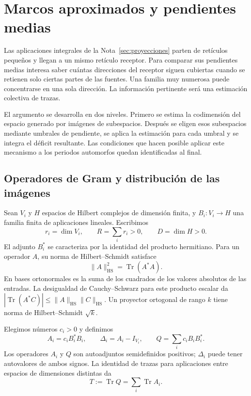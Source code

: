 \section{Marcos aproximados y pendientes medias}
\label{sec:marcos}


Las aplicaciones integrales de la Nota~\ref{sec:proyecciones} parten de
retículos pequeños y llegan a un mismo retículo receptor. Para comparar
sus pendientes medias interesa saber cuántas direcciones del receptor
siguen cubiertas cuando se retienen solo ciertas partes de las fuentes.
Una familia muy numerosa puede concentrarse en una sola dirección.
La información pertinente será una estimación colectiva de trazas.

El argumento se desarrolla en dos niveles. Primero se estima la
codimensión del espacio generado por imágenes de subespacios. Después
se eligen esos subespacios mediante umbrales de pendiente, se aplica la
estimación para cada umbral y se integra el déficit resultante. Las
condiciones que hacen posible aplicar este mecanismo a los periodos
automorfos quedan identificadas al final.

\subsection{Operadores de Gram y distribución de las imágenes}

Sean $V_i$ y $H$ espacios de Hilbert complejos de dimensión finita, y
$B_i:V_i\to H$ una familia finita de aplicaciones lineales. Escribimos
\[
 r_i=\dim V_i,\qquad R=\sum_i r_i>0,\qquad D=\dim H>0.
\]
El adjunto $B_i^*$ se caracteriza por la identidad del producto hermitiano.
Para un operador $A$, su norma de Hilbert--Schmidt satisface
\[
 \|A\|_{\mathrm{HS}}^2=\operatorname{Tr}(A^*A).
\]
En bases ortonormales es la suma de los cuadrados de los valores absolutos
de las entradas. La desigualdad de Cauchy--Schwarz para este producto
escalar da
$|\operatorname{Tr}(A^*C)|\le\|A\|_{\mathrm{HS}}\|C\|_{\mathrm{HS}}$.
Un proyector ortogonal de rango $k$ tiene norma de Hilbert--Schmidt
$\sqrt{k}$.

Elegimos números $c_i>0$ y definimos
\begin{equation}
 A_i=c_iB_i^*B_i,\qquad \Delta_i=A_i-I_{V_i},\qquad
 Q=\sum_i c_iB_iB_i^*.
 \label{eq:marcos-operadores}
\end{equation}
Los operadores $A_i$ y $Q$ son autoadjuntos semidefinidos positivos;
$\Delta_i$ puede tener autovalores de ambos signos. La identidad
de trazas para aplicaciones entre espacios de dimensiones distintas da
\[
 T:=\operatorname{Tr}Q=\sum_i\operatorname{Tr}A_i.
\]

